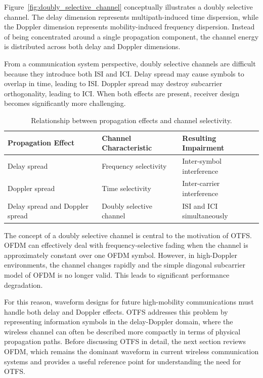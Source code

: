 Figure~\ref{fig:doubly_selective_channel} conceptually illustrates a doubly selective channel. The delay dimension represents multipath-induced time dispersion, while the Doppler dimension represents mobility-induced frequency dispersion. Instead of being concentrated around a single propagation component, the channel energy is distributed across both delay and Doppler dimensions.

From a communication system perspective, doubly selective channels are difficult because they introduce both ISI and ICI. Delay spread may cause symbols to overlap in time, leading to ISI. Doppler spread may destroy subcarrier orthogonality, leading to ICI. When both effects are present, receiver design becomes significantly more challenging.

\begin{table}[H]
\centering
\caption{Relationship between propagation effects and channel selectivity.}
\label{tab:channel_selectivity}

\begin{tabular}{|p{4cm}|p{4cm}|p{5cm}|}
\hline
\textbf{Propagation Effect} &
\textbf{Channel Characteristic} &
\textbf{Resulting Impairment} \\
\hline

Delay spread &
Frequency selectivity &
Inter-symbol interference \\
\hline

Doppler spread &
Time selectivity &
Inter-carrier interference \\
\hline

Delay spread and Doppler spread &
Doubly selective channel &
ISI and ICI simultaneously \\
\hline

\end{tabular}

\end{table}

The concept of a doubly selective channel is central to the motivation of OTFS. OFDM can effectively deal with frequency-selective fading when the channel is approximately constant over one OFDM symbol. However, in high-Doppler environments, the channel changes rapidly and the simple diagonal subcarrier model of OFDM is no longer valid. This leads to significant performance degradation.

For this reason, waveform designs for future high-mobility communications must handle both delay and Doppler effects. OTFS addresses this problem by representing information symbols in the delay-Doppler domain, where the wireless channel can often be described more compactly in terms of physical propagation paths. Before discussing OTFS in detail, the next section reviews OFDM, which remains the dominant waveform in current wireless communication systems and provides a useful reference point for understanding the need for OTFS.
